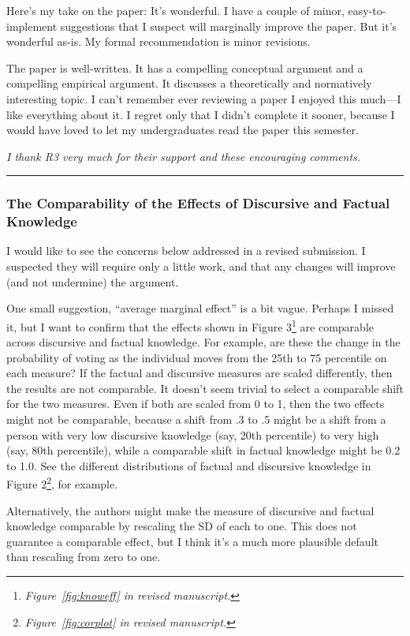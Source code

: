 Here's my take on the paper: It’s wonderful. I have a couple of minor, easy-to-implement suggestions that I suspect will marginally improve the paper. But it’s wonderful as-is. My formal recommendation is minor revisions.

The paper is well-written. It has a compelling conceptual argument and a compelling empirical argument. It discusses a theoretically and normatively interesting topic. I can't remember ever reviewing a paper I enjoyed this much—I like everything about it. I regret only that I didn’t complete it sooner, because I would have loved to let my undergraduates read the paper this semester.

\textit{I thank R3 very much for their support and these encouraging comments.}

\rule{\linewidth}{.01cm}


\subsubsection*{The Comparability of the Effects of Discursive and Factual Knowledge}

I would like to see the concerns below addressed in a revised submission. I suspected they will require only a little work, and that any changes will improve (and not undermine) the argument. 

One small suggestion, ``average marginal effect'' is a bit vague. Perhaps I missed it, but I want to confirm that the effects shown in Figure 3\footnote{\textit{Figure~\ref{fig:knoweff} in revised manuscript.}} are comparable across discursive and factual knowledge. For example, are these the change in the probability of voting as the individual moves from the 25th to 75 percentile on each measure? If the factual and discursive measures are scaled differently, then the results are not comparable. It doesn’t seem trivial to select a comparable shift for the two measures. Even if both are scaled from 0 to 1, then the two effects might not be comparable, because a shift from .3 to .5 might be a shift from a person with very low discursive knowledge (say, 20th percentile) to very high (say, 80th percentile), while a comparable shift in factual knowledge might be 0.2 to 1.0. See the different distributions of factual and discursive knowledge in Figure 2\footnote{\textit{Figure~\ref{fig:corplot} in revised manuscript.}}, for example.

Alternatively, the authors might make the measure of discursive and factual knowledge comparable by rescaling the SD of each to one. This does not guarantee a comparable effect, but I think it’s a much more plausible default than rescaling from zero to one.

